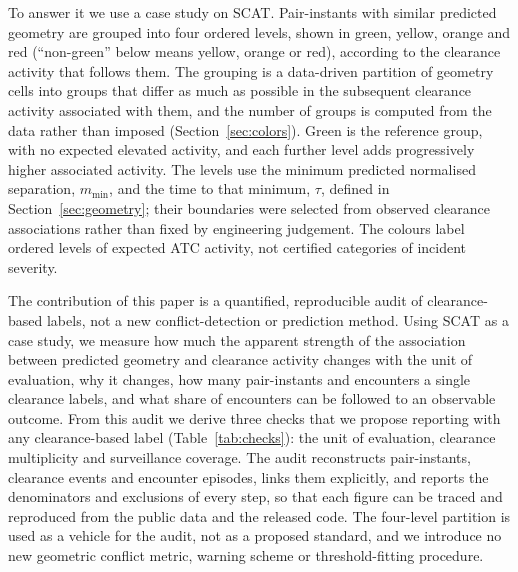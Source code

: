 \documentclass[aerospace,article,submit,moreauthors]{Definitions/mdpi}
\newcommand{\mmin}{m_{\min}}
\begin{document}
To answer it we use a case study on SCAT. Pair-instants with similar predicted geometry are grouped into four ordered levels, shown in green, yellow, orange and red (``non-green'' below means yellow, orange or red), according to the clearance activity that follows them. The grouping is a data-driven partition of geometry cells into groups that differ as much as possible in the subsequent clearance activity associated with them, and the number of groups is computed from the data rather than imposed (Section~\ref{sec:colors}). Green is the reference group, with no expected elevated activity, and each further level adds progressively higher associated activity. The levels use the minimum predicted normalised separation, $\mmin$, and the time to that minimum, $\tau$, defined in Section~\ref{sec:geometry}; their boundaries were selected from observed clearance associations rather than fixed by engineering judgement. The colours label ordered levels of expected ATC activity, not certified categories of incident severity.

The contribution of this paper is a quantified, reproducible audit of clearance-based labels, not a new conflict-detection or prediction method. Using SCAT as a case study, we measure how much the apparent strength of the association between predicted geometry and clearance activity changes with the unit of evaluation, why it changes, how many pair-instants and encounters a single clearance labels, and what share of encounters can be followed to an observable outcome. From this audit we derive three checks that we propose reporting with any clearance-based label (Table~\ref{tab:checks}): the unit of evaluation, clearance multiplicity and surveillance coverage. The audit reconstructs pair-instants, clearance events and encounter episodes, links them explicitly, and reports the denominators and exclusions of every step, so that each figure can be traced and reproduced from the public data and the released code. The four-level partition is used as a vehicle for the audit, not as a proposed standard, and we introduce no new geometric conflict metric, warning scheme or threshold-fitting procedure.
\end{document}
